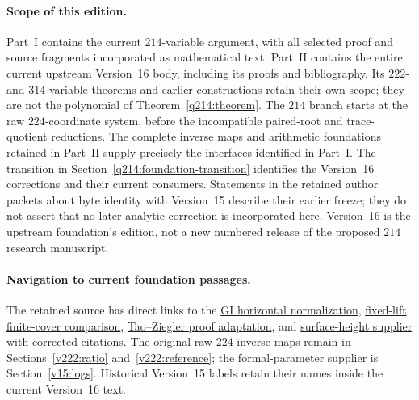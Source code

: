 \paragraph{Scope of this edition.}
Part~I contains the current $214$-variable argument, with all selected proof
and source fragments incorporated as mathematical text.  Part~II contains
the entire current upstream Version~16 body, including its proofs and bibliography.
Its $222$- and $314$-variable theorems and earlier constructions retain their
own scope; they are not the polynomial of Theorem~\ref{q214:theorem}.
The $214$ branch starts at the raw $224$-coordinate system, before the
incompatible paired-root and trace-quotient reductions.  The complete inverse
maps and arithmetic foundations retained in Part~II supply precisely the
interfaces identified in Part~I.
The transition in Section~\ref{q214:foundation-transition} identifies the
Version~16 corrections and their current consumers.  Statements in the retained
author packets about byte identity with Version~15 describe their earlier
freeze; they do not assert that no later analytic correction is incorporated
here.  Version~16 is the upstream foundation's edition, not a new numbered
release of the proposed $214$ research manuscript.

\paragraph{Navigation to current foundation passages.}
The retained source has direct links to the
\hyperref[q214foundation:gi-normalization]{GI horizontal normalization},
\hyperref[q214foundation:gi-cover]{fixed-lift finite-cover comparison},
\hyperref[q214foundation:tz-adaptation]{Tao--Ziegler proof adaptation}, and
\hyperref[q214foundation:cmh-surface]{surface-height supplier with corrected citations}.
The original raw-$224$ inverse maps remain in
Sections~\ref{v222:ratio} and~\ref{v222:reference}; the formal-parameter
supplier is Section~\ref{v15:logs}.  Historical Version~15 labels retain
their names inside the current Version~16 text.


